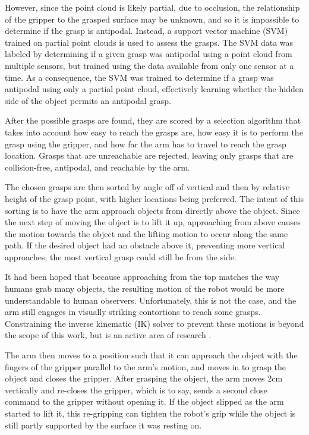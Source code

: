 \documentclass[letterpaper, 10 pt, conference]{ieeeconf}
\begin{document}
However, since the point cloud is likely partial, due to occlusion, the relationship of the gripper to the grasped surface may be unknown, and so it is impossible to determine if the grasp is antipodal. 
Instead, a support vector machine (SVM) trained on partial point clouds is used to assess the grasps. 
The SVM data was labeled by determining if a given grasp was antipodal using a point cloud from multiple sensors, but trained using the data available from only one sensor at a time. 
As a consequence, the SVM was trained to determine if a grasp was antipodal using only a partial point cloud, effectively learning whether the hidden side of the object permits an antipodal grasp. 

After the possible grasps are found, they are scored by a selection algorithm that takes into account how easy to reach the grasps are, how easy it is to perform the grasp using the gripper, and how far the arm has to travel to reach the grasp location.
Grasps that are unreachable are rejected, leaving only grasps that are collision-free, antipodal, and reachable by the arm. 

The chosen grasps are then sorted by angle off of vertical and then by relative height of the grasp point, with higher locations being preferred.
The intent of this sorting is to have the arm approach objects from directly above the object.
Since the next step of moving the object is to lift it up, approaching from above causes the motion towards the object and the lifting motion to occur along the same path. 
If the desired object had an obstacle above it, preventing more vertical approaches, the most vertical grasp could still be from the side.

It had been hoped that because approaching from the top matches the way humans grab many objects, the resulting motion of the robot would be more understandable to human observers. 
Unfortunately, this is not the case, and the arm still engages in visually striking contortions to reach some grasps.
Constraining the inverse kinematic (IK) solver to prevent these motions is beyond the scope of this work, but is an active area of research \cite{zhao2016experimental}.

The arm then moves to a position such that it can approach the object with the fingers of the gripper parallel to the arm's motion, and moves in to grasp the object and closes the gripper. 
After grasping the object, the arm moves 2cm vertically and re-closes the gripper, which is to say, sends a second close command to the gripper without opening it. 
If the object slipped as the arm started to lift it, this re-gripping can tighten the robot's grip while the object is still partly supported by the surface it was resting on. 
\end{document}
